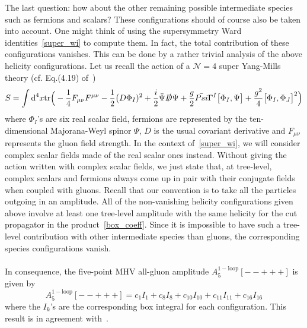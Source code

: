 %
%
%
The last question: how about the other remaining possible intermediate species such as fermions and scalars?
These configurations should of course also be taken into account.
One might think of using the supersymmetry Ward identities~\cref{super_wi} to compute them. 
In fact, the total contribution of these configurations vanishes.
This can be done by a rather trivial analysis of the above helicity configurations.
Let us recall the action of a $\mathcal{N} = 4$ super Yang-Mills theory (cf. \eg Eq.(4.19) of~\cite{Elvang:2013cua})
\begin{equation*}
S = \int \textrm{d}^4 x\mathrm{tr}\Big(
-\frac{1}{4}F_{\mu\nu}F^{\mu\nu} - \frac{1}{2}\big(D\Phi_I)^2 + \frac{i}{2}\bar{\Psi}\slashed{D}\Psi + \frac{g}{2}\bar{Psi}\Gamma^I \big[\Phi_I, \Psi\big] + \frac{g^2}{4}\big[\Phi_I, \Phi_J\big]^2\Big) 
\end{equation*}
where $\Phi_I$'s are six real scalar field, fermions are represented by the ten-dimensional Majorana-Weyl spinor $\Psi$, $D$ is the usual covariant derivative and $F_{\mu\nu}$ represents the gluon field strength.
In the context of~\cref{super_wi}, we will consider complex scalar fields made of the real scalar ones instead. 
Without giving the action written with complex scalar fields, we just state that, at tree-level, complex scalars and fermions always come up in pair with their conjugate fields when coupled with gluons. 
Recall that our convention is to take all the particles outgoing in an amplitude.
All of the non-vanishing helicity configurations given above involve at least one tree-level amplitude with the same helicity for the cut propagator in the product~\cref{box_coeff}.
Since it is impossible to have such a tree-level contribution with other intermediate species than gluons, the corresponding species configurations vanish.
\\\\
In consequence, the five-point MHV all-gluon amplitude $A_5^{\mathrm{1-loop}}[--+++]$ is given by
\begin{equation}
A_5^{\mathrm{1-loop}}[--+++] = c_1 I_{1} + c_8 I_8 + c_{10}I_{10} + c_{11}I_{11} + c_{16}I_{16}
\end{equation}
where the $I_{k}$'s are the corresponding box integral for each configuration.
This result is in agreement with~\cite{Bern:1994zx}.














